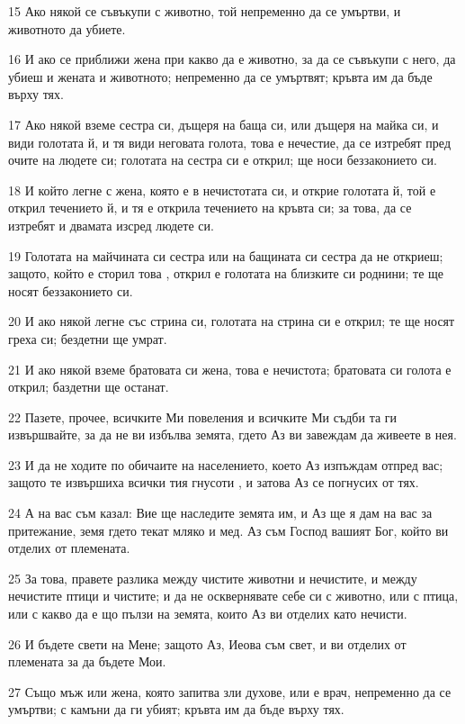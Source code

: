 \par 15 Ако някой се съвъкупи с животно, той непременно да се умъртви, и животното да убиете.
\par 16 И ако се приближи жена при какво да е животно, за да се съвъкупи с него, да убиеш и жената и животното; непременно да се умъртвят; кръвта им да бъде върху тях.
\par 17 Ако някой вземе сестра си, дъщеря на баща си, или дъщеря на майка си, и види голотата й, и тя види неговата голота, това е нечестие, да се изтребят пред очите на людете си; голотата на сестра си е открил; ще носи беззаконието си.
\par 18 И който легне с жена, която е в нечистотата си, и открие голотата й, той е открил течението й, и тя е открила течението на кръвта си; за това, да се изтребят и двамата изсред людете си.
\par 19 Голотата на майчината си сестра или на бащината си сестра да не откриеш; защото, който е сторил това , открил е голотата на близките си роднини; те ще носят беззаконието си.
\par 20 И ако някой легне със стрина си, голотата на стрина си е открил; те ще носят греха си; бездетни ще умрат.
\par 21 И ако някой вземе братовата си жена, това е нечистота; братовата си голота е открил; баздетни ще останат.
\par 22 Пазете, прочее, всичките Ми повеления и всичките Ми съдби та ги извършвайте, за да не ви избълва земята, гдето Аз ви завеждам да живеете в нея.
\par 23 И да не ходите по обичаите на населението, което Аз изпъждам отпред вас; защото те извършиха всички тия гнусоти , и затова Аз се погнусих от тях.
\par 24 А на вас съм казал: Вие ще наследите земята им, и Аз ще я дам на вас за притежание, земя гдето текат мляко и мед. Аз съм Господ вашият Бог, който ви отделих от племената.
\par 25 За това, правете разлика между чистите животни и нечистите, и между нечистите птици и чистите; и да не осквернявате себе си с животно, или с птица, или с какво да е що пълзи на земята, които Аз ви отделих като нечисти.
\par 26 И бъдете свети на Мене; защото Аз, Иеова съм свет, и ви отделих от племената за да бъдете Мои.
\par 27 Също мъж или жена, която запитва зли духове, или е врач, непременно да се умъртви; с камъни да ги убият; кръвта им да бъде върху тях.

